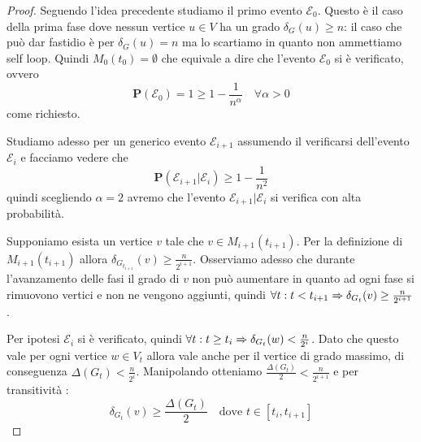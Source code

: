 \documentclass{article}
\begin{document}
\begin{proof}
    Seguendo l'idea precedente studiamo il primo evento $\mathcal{E}_0$. Questo 
    \`e il caso della prima fase dove nessun vertice $u \in V$ ha un grado 
    $\delta_G(u) \geq n$: il caso che pu\`o dar fastidio \`e per
    $\delta_G(u) = n$ ma lo scartiamo in quanto non ammettiamo self loop. 
    Quindi $M_0(t_0) = \emptyset$ che equivale a dire
    che l'evento $\mathcal{E}_0$ si \`e verificato, ovvero 
    \begin{displaymath}
        \mathbf{P} (\mathcal{E}_0) = 1 \geq 1 - \frac{1}{n^\alpha} \quad
        \forall \alpha > 0
    \end{displaymath}    
     come richiesto.

    Studiamo adesso per un generico evento $\mathcal{E}_{i+1}$ assumendo il
    verificarsi dell'evento $\mathcal{E}_{i}$ e facciamo vedere che
    \begin{displaymath}
        \mathbf{P}(\mathcal{E}_{i+1} | \mathcal{E}_{i}) \geq 1 - \frac{1}{n^2}
    \end{displaymath}
    quindi scegliendo $\alpha = 2$ avremo che l'evento 
    $\mathcal{E}_{i+1} | \mathcal{E}_{i}$ si verifica con alta probabilit\`a.

    Supponiamo esista un vertice $v$ tale che $v \in M_{i+1}(t_{i+1})$. Per
    la definizione di $M_{i+1}(t_{i+1})$ allora $\delta_{G_{t_{i+1}}}(v) 
    \geq \frac{n}{2^{i+1}}$. Osserviamo adesso che durante l'avanzamento delle
    fasi il grado di $v$ non pu\`o aumentare in quanto ad ogni fase si 
    rimuovono vertici e non ne vengono aggiunti, quindi $\forall t: 
    t < t_{i+1} \Rightarrow \delta_{G_{t}}(v) \geq \frac{n}{2^{i+1}}$.

    Per ipotesi $\mathcal{E}_i$ si \`e verificato, quindi $\forall t: 
    t \geq t_i \Rightarrow \delta_{G_{t}}(w) < \frac{n}{2^i}$.
    Dato che questo vale per ogni vertice $w \in V_t$ allora vale anche 
    per il vertice di grado massimo, di conseguenza 
    $\Delta(G_{t}) < \frac{n}{2^i}$. Manipolando otteniamo
    $\frac{\Delta(G_{t})}{2} < \frac{n}{2^{i+1}}$ e per transitivit\`a :
    \begin{displaymath}
        \delta_{G_t}(v) \geq \frac{\Delta(G_{t})}{2} \quad \text{dove } 
        t \in [t_i,t_{i+1}]
    \end{displaymath}


\end{proof}
\end{document}
